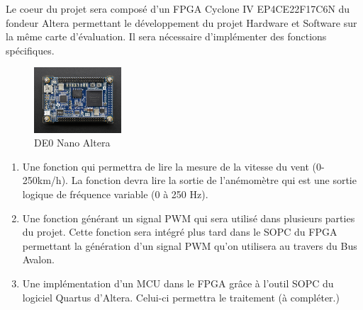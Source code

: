 Le coeur du projet sera composé d'un FPGA Cyclone IV EP4CE22F17C6N du fondeur Altera permettant le développement du projet Hardware et Software sur la même carte d'évaluation. Il sera nécessaire d'implémenter des fonctions spécifiques.
\begin{figure}
    \begin{center}
      \includegraphics[angle=90, width=0.29\textwidth]{images/DE0.jpg}
      \caption{DE0 Nano Altera}
    \end{center}
  \end{figure}  
\begin{enumerate}
    \item Une fonction qui permettra de lire la mesure de la vitesse du vent (0-250km/h). La fonction devra lire la sortie de l'anémomètre qui est une sortie logique de fréquence variable (0 à 250 Hz). 
    \item Une fonction générant un signal PWM qui sera utilisé dans plusieurs parties du projet. Cette fonction sera intégré plus tard dans le SOPC du FPGA permettant la génération d'un signal PWM qu'on utilisera au travers du Bus Avalon.
    \item Une implémentation d'un MCU dans le FPGA grâce à l'outil SOPC du logiciel Quartus d'Altera. Celui-ci permettra le traitement (à compléter.)
\end{enumerate}
